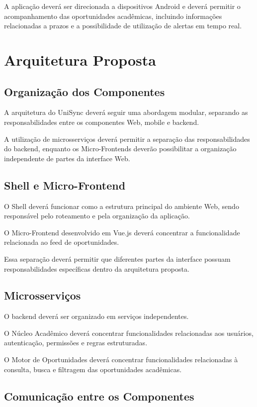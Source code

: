 \documentclass[12pt,oneside,a4paper,chapter=TITLE]{abntex2}
\begin{document}
A aplicação deverá ser direcionada a dispositivos Android e deverá
permitir o acompanhamento das oportunidades acadêmicas, incluindo
informações relacionadas a prazos e a possibilidade de utilização de
alertas em tempo real.

\chapter{Arquitetura Proposta}

\section{Organização dos Componentes}

A arquitetura do UniSync deverá seguir uma abordagem modular, separando
as responsabilidades entre os componentes Web, mobile e backend.

A utilização de microsserviços deverá permitir a separação das
responsabilidades do backend, enquanto os Micro-Frontends deverão
possibilitar a organização independente de partes da interface Web.

\section{Shell e Micro-Frontend}

O Shell deverá funcionar como a estrutura principal do ambiente Web,
sendo responsável pelo roteamento e pela organização da aplicação.

O Micro-Frontend desenvolvido em Vue.js deverá concentrar a
funcionalidade relacionada ao feed de oportunidades.

Essa separação deverá permitir que diferentes partes da interface
possuam responsabilidades específicas dentro da arquitetura proposta.

\section{Microsserviços}

O backend deverá ser organizado em serviços independentes.

O Núcleo Acadêmico deverá concentrar funcionalidades relacionadas aos
usuários, autenticação, permissões e regras estruturadas.

O Motor de Oportunidades deverá concentrar funcionalidades relacionadas
à consulta, busca e filtragem das oportunidades acadêmicas.

\section{Comunicação entre os Componentes}
\end{document}
